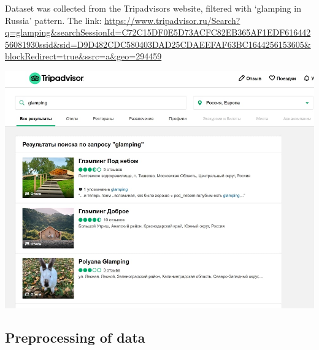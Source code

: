\documentclass{article}
\begin{document}
\newpage
Dataset was collected from the Tripadvisors website, filtered with ‘glamping in Russia’ pattern. The link: \url{https://www.tripadvisor.ru/Search?q=glamping&searchSessionId=C72C15DF0E5D73ACFC82EB365AF1EDF61644256081930ssid&sid=D9D482CDC580403DAD25CDAEEFAF63BC1644256153605&blockRedirect=true&ssrc=a&geo=294459}

\begin{center}
\includegraphics[width=1\linewidth]{images/figure 4.jpg}
\end{center}

\subsection{Preprocessing of data}
\setcounter{section}{9}
\end{document}
